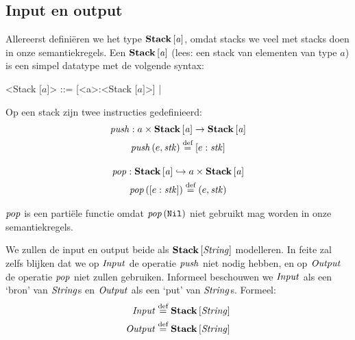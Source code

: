 \subsection{Input en output}
\label{sec:def:io}

Allereerst definiëren we het type $\mathbf{Stack}\left[\mathit{a}\right]$, omdat stacks we veel met stacks
doen in onze semantiekregels. Een $\mathbf{Stack}\left[\mathit{a}\right]$ (lees: een stack van elementen
van type $a$) is een simpel datatype met de volgende syntax:

\def\inbrackets#1{$\mathrm{[}#1\mathrm{]}$}
\def\bracka{\inbrackets{a}}
\begin{grammar}
	<Stack \bracka> ::= [<a>:<Stack \bracka>] | \Nil
\end{grammar}

Op een stack zijn twee instructies gedefinieerd:
\begin{gather*}
	\mathit{push} : a \times \mathbf{Stack}\left[\mathit{a}\right] \to \mathbf{Stack}\left[\mathit{a}\right] \\
	\mathit{push}\left(e, \mathit{stk}\right) \stackrel{\text{def}}{=} [e:\mathit{stk}] \\[1em]
	\mathit{pop} : \mathbf{Stack}\left[\mathit{a}\right] \hookrightarrow a \times \mathbf{Stack}\left[\mathit{a}\right] \\
	\mathit{pop}\left([e:\mathit{stk}]\right) \stackrel{\text{def}}{=} (e,\mathit{stk}) \\
\end{gather*}

$\mathit{pop}$ is een partiële functie omdat $\mathit{pop}\left(\texttt{Nil}\right)$ niet gebruikt mag worden in
onze semantiekregels. %

\medskip
We zullen de input en output beide als $\mathbf{Stack}\left[\mathit{\mathit{String}}\right]$ modelleren. In feite
zal zelfs blijken dat we op $\mathit{Input}$ de operatie $\mathit{push}$ niet nodig hebben,
en op $\mathit{Output}$ de operatie $\mathit{pop}$ niet zullen gebruiken. Informeel
beschouwen we $\mathit{Input}$ als een `bron' van $\mathit{String}$s en $\mathit{Output}$ als een `put'
van $\mathit{String}$s. Formeel:
\begin{align*}
	\mathit{Input} &\stackrel{\text{def}}{=} \mathbf{Stack}\left[\mathit{\mathit{String}}\right] \\ \mathit{Output} &\stackrel{\text{def}}{=} \mathbf{Stack}\left[\mathit{\mathit{String}}\right]
\end{align*}

